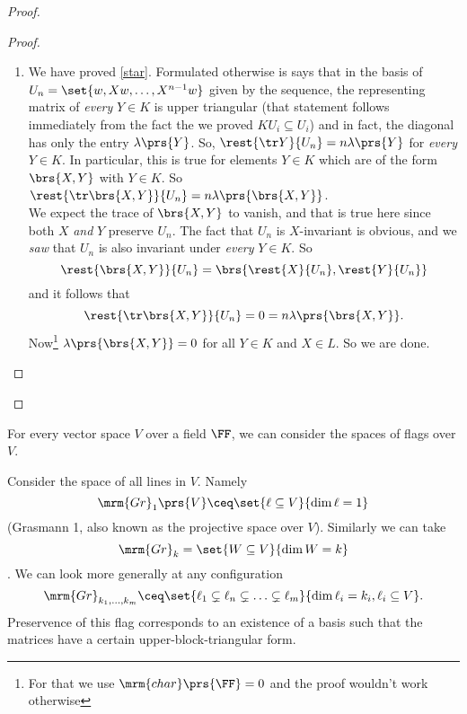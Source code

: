 \documentclass[10pt,a4paper,twoside,openany,hidelinks]{book}
\begin{document}
\begin{proof}
\begin{description}
\begin{proof}
\begin{enumerate}[label = \Roman*)]
\begin{proof}
\begin{enumerate}[label = (\roman*)]
\begin{itemize}
But by definition, $X U_{i-1} \subseteq U_i$. Hence
\[XYX^{i-1} = \lambda\prs{Y}X^i + w''\]
where $w'' \in U_i$.
\item The second summand \[\brs{X,Y}X^{i-1}w = \lambda\prs{\brs{X,Y}}X^{i-1}w + w'''\] where $w''' \in U_{i-1}$ by the induction hypothesis.
This means \[\brs{X,Y} X^{i-1}w \in U_i + U_{i-1} \subseteq U_i\text{.}\]
\end{itemize}
The net conclusion is that
\begin{align*}
YX^i w = \lambda\prs{Y}X^i w + w''''
\end{align*}
with $w'''' \in U_i$.
So $YX^iw \equiv \lambda\prs{Y}X^i w \mod{U_i}$ for all $1 \leq i \leq n$.
\end{enumerate}
\end{proof}
\item We have proved \eqref{star}. Formulated otherwise is says that in the basis of $U_n = \set{w, Xw, \ldots, X^{n-1}w}$ given by the sequence, the representing matrix of \emph{every} $Y \in K$ is upper triangular (that statement follows immediately from the fact the we proved $KU_i \subseteq U_i$) and in fact, the diagonal has only the entry $\lambda\prs{Y}$.
So, $\rest{\tr Y}{U_n} = n\lambda\prs{Y}$ for \emph{every} $Y \in K$.
In particular, this is true for elements $Y \in K$ which are of the form $\brs{X,Y}$ with $Y \in K$.
So $\rest{\tr \brs{X,Y}}{U_n} = n\lambda\prs{\brs{X,Y}}$. \\
We expect the trace of $\brs{X,Y}$ to vanish, and that is true here since both $X$ \emph{and} $Y$ preserve $U_n$. The fact that $U_n$ is $X$-invariant is obvious, and we \emph{saw} that $U_n$ is also invariant under \emph{every} $Y \in K$.
So
\[\rest{\brs{X,Y}}{U_n} = \brs{\rest{X}{U_n}, \rest{Y}{U_n}}\]
and it follows that
\[\rest{\tr\brs{X,Y}}{U_n} = 0 = n\lambda\prs{\brs{X,Y}}\text{.}\]
Now\footnote{For that we use $\mrm{char}\prs{\FF} = 0$ and the proof wouldn't work otherwise} $\lambda\prs{\brs{X,Y}} = 0$ for all $Y \in K$ and $X \in L$. So we are done.
\end{enumerate}
\end{proof}
\end{description}
\end{proof}
\begin{remark}
For every vector space $V$ over a field $\FF$,%
we can consider the spaces of flags over $V$.
\end{remark}
\begin{example}
Consider the space of all lines in $V$. Namely \[\mrm{Gr}_1\prs{V} \ceq \set{\ell \subseteq V}{\dim \ell = 1}\] (Grasmann 1, also known as the projective space over $V$).
Similarly we can take
\[\mrm{Gr}_k = \set{W \subseteq V}{\dim W = k}\] .
We can look more generally at any configuration
\[\mrm{Gr}_{k_1, \ldots, k_m} \ceq \set{\ell_1 \subsetneq \ell_n \subsetneq \ldots \subsetneq \ell_m}{\dim \ell_i = k_i , \ell_i \subseteq V}\text{.}\]
Preservence of this flag corresponds to an existence of a basis such that the matrices have a certain upper-block-triangular form.
\end{example}
\end{document}
